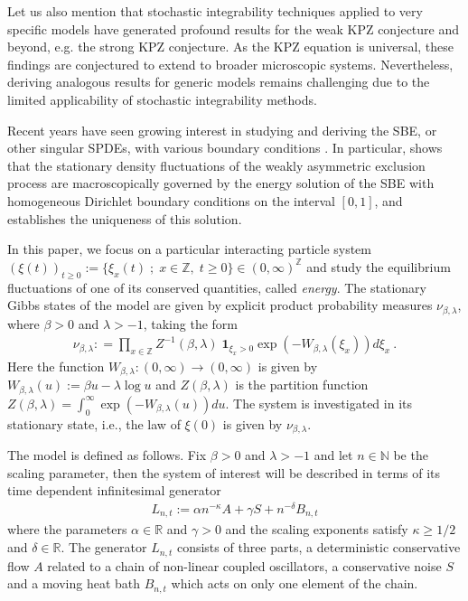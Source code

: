\documentclass[a4paper, reqno, 12pt]{amsart}
\theoremstyle{plain}
\theoremstyle{definition}
\newcommand{\R}{\mathbb{R}}
\newcommand{\N}{\mathbb{N}}
\begin{document}
\bigskip

Let us also mention that stochastic integrability techniques applied to very specific models have generated profound results for the weak KPZ conjecture and beyond, e.g. the strong KPZ conjecture. As the KPZ equation is universal, these findings are conjectured to extend to broader microscopic systems. Nevertheless, deriving analogous results for generic models remains challenging due to the limited applicability of stochastic integrability methods.

\bigskip

Recent years have seen growing interest in studying and deriving the SBE, or other singular SPDEs, with various boundary conditions \cite{CS18, GH18}. In particular, \cite{GPS20} shows  that the stationary density fluctuations of the weakly asymmetric exclusion process are macroscopically governed by the energy solution of the SBE with homogeneous Dirichlet boundary conditions on the interval $[0,1]$, and establishes the uniqueness of this solution.


\bigskip 
In this paper, we focus on a particular interacting particle system $(\xi(t))_{t \ge 0}:=\{\xi_x (t) \; ; \; x\in\mathbb Z, \; t\ge 0\} \in (0,\infty)^{\mathbb Z}$ and study the equilibrium fluctuations of one of its conserved quantities, called \textit{energy}. The stationary Gibbs states of the model are given by explicit product probability measures $\nu_{\beta, \lambda}$, where $\beta>0$ and $\lambda>-1$, taking the form 
\begin{align} 
\label{def:nu}
    \nu_{\beta,\lambda} : = \prod_{x\in\mathbb{Z}} Z^{-1} (\beta, \lambda)\;  {\mathbf 1}_{\xi_x>0} \exp (-W_{\beta,\lambda}(\xi_x)) d\xi_x \ .
\end{align}
Here the function $W_{\beta, \lambda}:(0,\infty)\to (0,\infty)$ is given by $W_{\beta,\lambda}(u):= \beta u -\lambda \log u $ and $ Z(\beta, \lambda)$ is the partition function $Z(\beta, \lambda) = \int_0^{\infty} \exp (-W_{\beta, \lambda} (u) ) du$. The system is investigated in its stationary state, i.e., the law of $\xi(0)$ is given by $\nu_{\beta, \lambda}$. 

\bigskip 

The model is defined as follows. Fix $\beta>0$ and $\lambda>-1$ and let $n\in\N$ be the scaling parameter, then the system of interest will be described in terms of its time dependent infinitesimal generator 
\begin{align} 
\label{def:L_nt}
    L_{n,t} := \alpha n^{-\kappa}A + \gamma S + {n^{-\delta}}B_{n,t}
\end{align} 
where the parameters $\alpha\in\R$ and $\gamma> 0$ and the scaling exponents satisfy  $\kappa\geq 1/2$ and $\delta\in\R$. The generator $L_{n,t}$ consists of three parts, a deterministic conservative flow $A$ related to a chain of  non-linear coupled oscillators, a conservative noise $S$ and a moving heat bath $B_{n,t}$ which acts on only one element of the chain.
\end{document}
